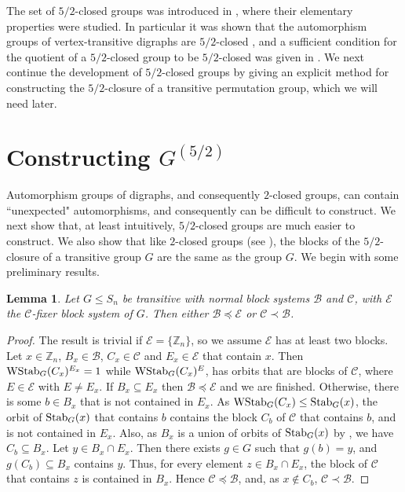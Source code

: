 \documentclass{amsart}
\newtheorem{lem}[thrm]{Lemma}
\theoremstyle{definition}
\theoremstyle{remark}
\numberwithin{equation}{section}
\def\Z{{\mathbb Z}}
\def\Stab{{\rm Stab}}
\def\cal{\mathcal}
\def\WStab{{\rm WStab}}
\begin{document}
The set of $5/2$-closed groups was introduced in \cite{Dobson2023apreprint}, where their elementary properties were studied.  In particular it was shown that the automorphism groups of vertex-transitive digraphs are $5/2$-closed \cite[Theorem 3.6]{Dobson2023apreprint}, and a sufficient condition for the quotient of a $5/2$-closed group to be $5/2$-closed was given in \cite[Theorem 2.3]{Dobson2023apreprint}.  We next continue the development of $5/2$-closed groups by giving an explicit method for constructing the $5/2$-closure of a transitive permutation group, which we will need later.

\section{Constructing $G^{(5/2)}$}

Automorphism groups of digraphs, and consequently $2$-closed groups, can contain ``unexpected" automorphisms, and consequently can be difficult to construct.  We next show that, at least intuitively, $5/2$-closed groups are much easier to construct.  We also show that like $2$-closed groups (see \cite[Theorem 4.11]{Wielandt1969}), the blocks of the $5/2$-closure of a transitive group $G$ are the same as the group $G$.  We begin with some preliminary results.

\begin{lem}\label{blocks with restrictions}
Let $G\le S_n$ be transitive with normal block systems ${\cal B}$ and ${\cal C}$, with ${\cal E}$ the ${\cal C}$-fixer block system of $G$.  Then either ${\cal B}\preceq{\cal E}$ or ${\cal C}\prec{\cal B}$.
\end{lem}

\begin{proof}
The result is trivial if ${\cal E} = \{\Z_n\}$, so we assume ${\cal E}$ has at least two blocks.  Let $x\in\Z_n$, $B_x\in{\cal B}$, $C_x\in{\cal C}$ and $E_x\in{\cal E}$ that contain $x$.  Then $\WStab_G(C_x)^{E_x} = 1$ while $\WStab_G(C_x)^E$, has orbits that are blocks of ${\cal C}$, where $E\in{\cal E}$ with $E\not = E_x$.  If $B_x\subseteq E_x$ then ${\cal B}\preceq{\cal E}$ and we are finished.  Otherwise, there is some $b\in B_x$ that is not contained in $E_x$.  As $\WStab_G(C_x)\le\Stab_G(x)$, the orbit of $\Stab_G(x)$ that contains $b$ contains the block $C_b$ of ${\cal C}$ that contains $b$, and is not contained in $E_x$.  Also, as $B_x$ is a union of orbits of $\Stab_G(x)$ by \cite[Exercise 1.5.9]{DixonM1996}, we have $C_b\subseteq B_x$.  Let $y\in B_x\cap E_x$.  Then there exists $g\in G$ such that $g(b) = y$, and $g(C_b)\subseteq B_x$ contains $y$.  Thus, for every element $z\in B_x\cap E_x$, the block of ${\cal C}$ that contains $z$ is contained in $B_x$.  Hence ${\cal C}\preceq{\cal B}$, and, as $x\not\in C_b$, ${\cal C}\prec{\cal B}$.
\end{proof}
\end{document}
